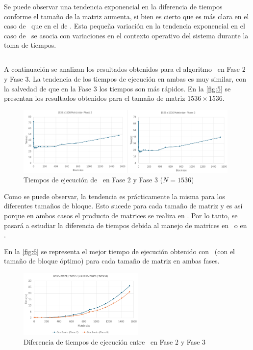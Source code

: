 Se puede observar una tendencia exponencial en la diferencia de tiempos conforme el tamaño de la matriz aumenta, si bien es cierto 
que es más clara en el caso de \colmajor\ que en el de \rowmajor. Esta pequeña variación en la tendencia exponencial en el caso de \rowmajor\ 
se asocia con variaciones en el contexto operativo del sistema durante la toma de tiempos.

\subsection{\zorder} \label{sec:4.2}
A continuación se analizan los resultados obtenidos para el algoritmo \zorder\ en Fase 2 y Fase 3. La tendencia de los tiempos de 
ejecución en ambas es muy similar, con la salvedad de que en la Fase 3 los tiempos son más rápidos. En la 
\autoref{fig:5} se presentan los resultados obtenidos para el tamaño de matriz $1536 \times 1536$.

\begin{figure}[h]
    \centering
    \includegraphics[width=0.98\textwidth]{img/5.png}
    \caption{Tiempos de ejecución de \zorder\ en Fase 2 y Fase 3 ($N = 1536$)}
    \label{fig:5}
\end{figure}

Como se puede observar, la tendencia es prácticamente la misma para los diferentes tamaños de bloque. Esto sucede para cada 
tamaño de matriz y es así porque en ambos casos el producto de matrices se realiza en \C. Por lo tanto, se pasará a estudiar 
la diferencia de tiempos debida al manejo de matrices en \python\ o en \C. 
\newpage

En la \autoref{fig:6} se representa el mejor tiempo de ejecución obtenido con \zorder\ (con el tamaño de bloque óptimo) para 
cada tamaño de matriz en ambas fases.

\begin{figure}[h]
    \centering
    \includegraphics[width=0.55\textwidth]{img/6.png}
    \caption{Diferencia de tiempos de ejecución entre \zorder\ en Fase 2 y Fase 3}
    \label{fig:6}
\end{figure}

